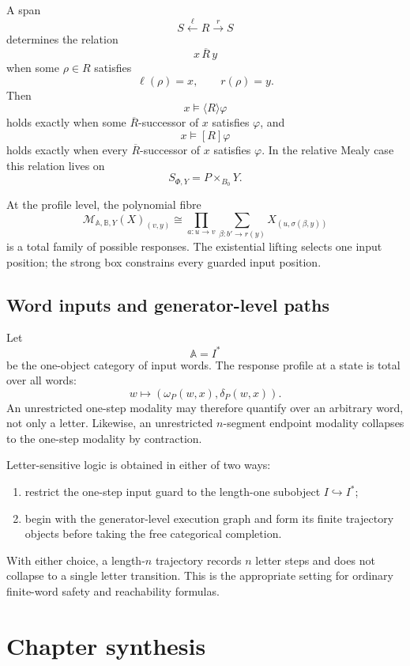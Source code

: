 A span
\[
    S\xleftarrow{\ell}R\xrightarrow{r}S
\]
determines the relation
\[
    x\,\overline R\,y
\]
when some \(\rho\in R\) satisfies
\[
    \ell(\rho)=x,
    \qquad
    r(\rho)=y.
\]
Then
\[
    x\models\langle R\rangle\varphi
\]
holds exactly when some \(\overline R\)-successor of \(x\) satisfies
\(\varphi\), and
\[
    x\models[R]\varphi
\]
holds exactly when every \(\overline R\)-successor of \(x\) satisfies
\(\varphi\).  In the relative Mealy case this relation lives on
\[
    S_{\Phi,Y}=P\times_{B_0}Y.
\]

At the profile level, the polynomial fibre
\[
    \mathcal M_{\mathbb A,\mathbb B,Y}(X)_{(v,y)}
    \cong
    \prod_{a:u\to v}
    \sum_{\beta:b'\to r(y)}
    X_{(u,\sigma(\beta,y))}
\]
is a total family of possible responses.  The existential lifting selects one
input position; the strong box constrains every guarded input position.

\subsection{Word inputs and generator-level paths}
\label{subsec:dynamic-word-generator-level-logic}

Let
\[
    \mathbb A=I^\ast
\]
be the one-object category of input words.  The response profile at a state is
total over all words:
\[
    w\longmapsto
    \left(
        \omega_P(w,x),
        \delta_P(w,x)
    \right).
\]
An unrestricted one-step modality may therefore quantify over an arbitrary
word, not only a letter.  Likewise, an unrestricted \(n\)-segment endpoint
modality collapses to the one-step modality by contraction.

Letter-sensitive logic is obtained in either of two ways:

\begin{enumerate}
\item restrict the one-step input guard to the length-one subobject
\(I\hookrightarrow I^\ast\);
\item begin with the generator-level execution graph and form its finite
trajectory objects before taking the free categorical completion.
\end{enumerate}

With either choice, a length-\(n\) trajectory records \(n\) letter steps and
does not collapse to a single letter transition.  This is the appropriate
setting for ordinary finite-word safety and reachability formulas.


\section{Chapter synthesis}
\label{sec:dynamic-response-trajectory-synthesis}

